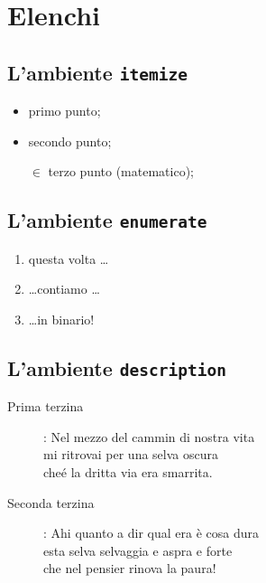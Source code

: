 \section{Elenchi}

\subsection{L'ambiente \texttt{itemize}}

\begin{itemize}
  \item primo punto;
  \item secondo punto;
  \item[$\in$] terzo punto (matematico);
\end{itemize}

\subsection{L'ambiente \texttt{enumerate}}

\begin{enumerate}
  \item questa volta \ldots
  \setcounter{enumi}{9}
  \item \ldots contiamo \ldots
  \item \ldots in binario!
\end{enumerate}

\subsection{L'ambiente \texttt{description}}

\begin{description}
  \item[Prima terzina]:
Nel mezzo del cammin di nostra vita\\
mi ritrovai per una selva oscura\\
che\'e la dritta via era smarrita.
  \item[Seconda terzina]:
Ahi quanto a dir qual era \`e cosa dura\\
esta selva selvaggia e aspra e forte\\
che nel pensier rinova la paura!
\end{description}